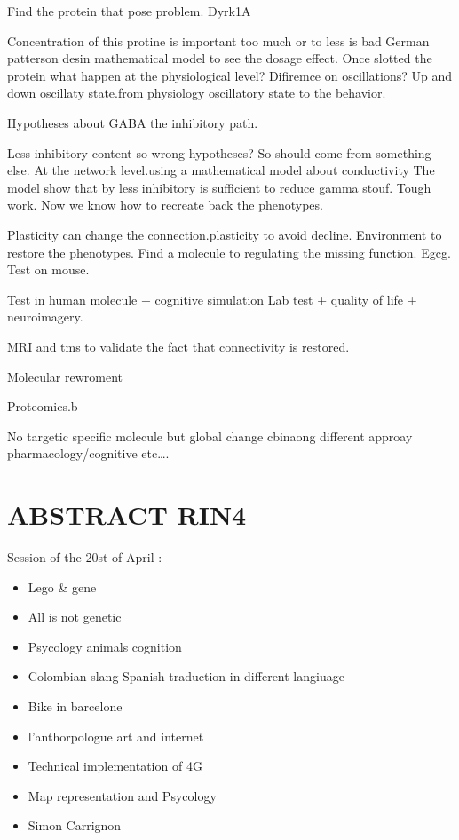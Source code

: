 \documentclass[10pt,letterpaper]{article}
\begin{document}
Find the protein that pose problem. Dyrk1A

Concentration of this protine is important too much or to less is bad
German patterson desin mathematical model to see the dosage effect.
Once slotted the protein what happen at the physiological level?
Difiremce on oscillations?
Up and down oscillaty state.from physiology oscillatory state to the behavior.

Hypotheses about GABA the inhibitory path.

Less inhibitory content so wrong hypotheses? So should come from something else.
At the network level.using a mathematical model about conductivity
The model show that by less inhibitory is sufficient to reduce gamma stouf. Tough work.
Now we know how to recreate back the phenotypes.

Plasticity can change the connection.plasticity to avoid decline. Environment to restore the phenotypes.
Find a molecule to regulating the missing function. Egcg. Test on mouse.

Test in human molecule + cognitive simulation
Lab test + quality of life + neuroimagery.

MRI and tms to validate the fact that connectivity is restored.

Molecular rewroment

Proteomics.b

No targetic specific molecule but global change cbinaong different approay pharmacology/cognitive etc\ldots.


\section{ABSTRACT RIN4}
Session of the 20st of April :

\begin{itemize}
    \item Lego \& gene
    \item All is not genetic
    \item Psycology animals cognition
    \item Colombian slang Spanish traduction in different langiuage
    \item Bike in barcelone
    \item l'anthorpologue art and internet
    \item Technical implementation of 4G
    \item Map representation and Psycology
    \item Simon Carrignon
\end{itemize}
\end{document}
